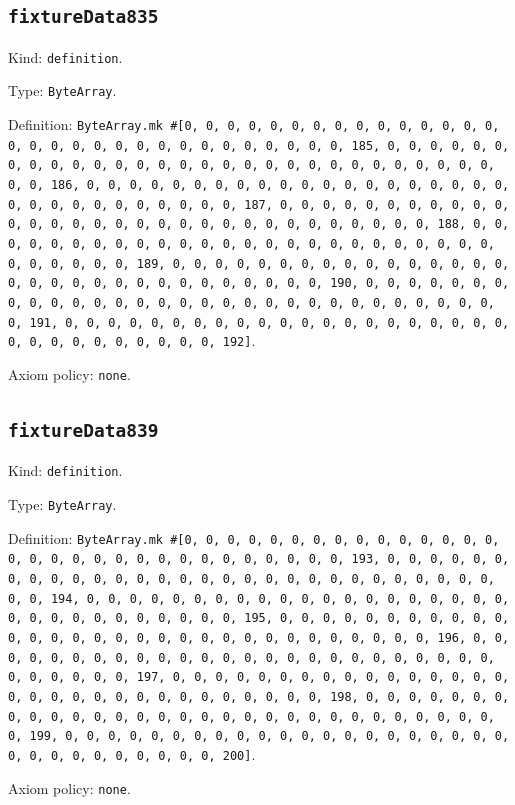 \documentclass[11pt]{article}
\begin{document}
\subsection*{\texttt{fixtureData835}}
\noindent Kind: \texttt{definition}.\par
\noindent Type: \texttt{ByteArray}.\par
\noindent Definition: \texttt{ByteArray.mk \#[0, 0, 0, 0, 0, 0, 0, 0, 0, 0, 0, 0, 0, 0, 0, 0, 0, 0, 0, 0, 0, 0, 0, 0, 0, 0, 0, 0, 0, 0, 0, 185, 0, 0, 0, 0, 0, 0, 0, 0, 0, 0, 0, 0, 0, 0, 0, 0, 0, 0, 0, 0, 0, 0, 0, 0, 0, 0, 0, 0, 0, 0, 0, 186, 0, 0, 0, 0, 0, 0, 0, 0, 0, 0, 0, 0, 0, 0, 0, 0, 0, 0, 0, 0, 0, 0, 0, 0, 0, 0, 0, 0, 0, 0, 0, 187, 0, 0, 0, 0, 0, 0, 0, 0, 0, 0, 0, 0, 0, 0, 0, 0, 0, 0, 0, 0, 0, 0, 0, 0, 0, 0, 0, 0, 0, 0, 0, 188, 0, 0, 0, 0, 0, 0, 0, 0, 0, 0, 0, 0, 0, 0, 0, 0, 0, 0, 0, 0, 0, 0, 0, 0, 0, 0, 0, 0, 0, 0, 0, 189, 0, 0, 0, 0, 0, 0, 0, 0, 0, 0, 0, 0, 0, 0, 0, 0, 0, 0, 0, 0, 0, 0, 0, 0, 0, 0, 0, 0, 0, 0, 0, 190, 0, 0, 0, 0, 0, 0, 0, 0, 0, 0, 0, 0, 0, 0, 0, 0, 0, 0, 0, 0, 0, 0, 0, 0, 0, 0, 0, 0, 0, 0, 0, 191, 0, 0, 0, 0, 0, 0, 0, 0, 0, 0, 0, 0, 0, 0, 0, 0, 0, 0, 0, 0, 0, 0, 0, 0, 0, 0, 0, 0, 0, 0, 0, 192]}.\par
\noindent Axiom policy: \texttt{none}.\par
\subsection*{\texttt{fixtureData839}}
\noindent Kind: \texttt{definition}.\par
\noindent Type: \texttt{ByteArray}.\par
\noindent Definition: \texttt{ByteArray.mk \#[0, 0, 0, 0, 0, 0, 0, 0, 0, 0, 0, 0, 0, 0, 0, 0, 0, 0, 0, 0, 0, 0, 0, 0, 0, 0, 0, 0, 0, 0, 0, 193, 0, 0, 0, 0, 0, 0, 0, 0, 0, 0, 0, 0, 0, 0, 0, 0, 0, 0, 0, 0, 0, 0, 0, 0, 0, 0, 0, 0, 0, 0, 0, 194, 0, 0, 0, 0, 0, 0, 0, 0, 0, 0, 0, 0, 0, 0, 0, 0, 0, 0, 0, 0, 0, 0, 0, 0, 0, 0, 0, 0, 0, 0, 0, 195, 0, 0, 0, 0, 0, 0, 0, 0, 0, 0, 0, 0, 0, 0, 0, 0, 0, 0, 0, 0, 0, 0, 0, 0, 0, 0, 0, 0, 0, 0, 0, 196, 0, 0, 0, 0, 0, 0, 0, 0, 0, 0, 0, 0, 0, 0, 0, 0, 0, 0, 0, 0, 0, 0, 0, 0, 0, 0, 0, 0, 0, 0, 0, 197, 0, 0, 0, 0, 0, 0, 0, 0, 0, 0, 0, 0, 0, 0, 0, 0, 0, 0, 0, 0, 0, 0, 0, 0, 0, 0, 0, 0, 0, 0, 0, 198, 0, 0, 0, 0, 0, 0, 0, 0, 0, 0, 0, 0, 0, 0, 0, 0, 0, 0, 0, 0, 0, 0, 0, 0, 0, 0, 0, 0, 0, 0, 0, 199, 0, 0, 0, 0, 0, 0, 0, 0, 0, 0, 0, 0, 0, 0, 0, 0, 0, 0, 0, 0, 0, 0, 0, 0, 0, 0, 0, 0, 0, 0, 0, 200]}.\par
\noindent Axiom policy: \texttt{none}.\par
\end{document}
